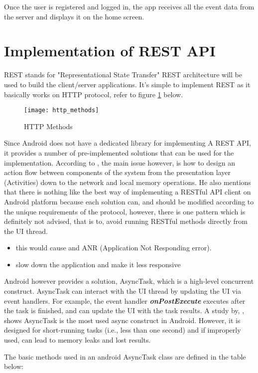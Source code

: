  Once the user is registered and logged in, the app receives all the event data from the server and displays it on the home screen.

\section{Implementation of REST API}
REST stands for "Representational State Transfer" REST architecture will be used to build the client/server applications. It's simple to implement REST as it basically works on HTTP protocol, refer to figure \ref{fig:http_methods} below.
\begin{figure}[h!]
	\centering       
	\texttt{[image: http\_methods]}
	\caption{HTTP Methods}
	\label{fig:http_methods}	
\end{figure} 

Since Android does not have a dedicated library for implementing A REST API, it provides a number of pre-implemented solutions that can be used for the implementation. According to \cite{kwon2016design}, the main issue however, is how to design an action
flow between components of the system from the presentation layer (Activities) down to the network and local memory operations.
He also mentions that there is nothing like the best way of implementing a RESTful API client on Android platform
because each solution can, and should be modified according to the unique requirements
of the protocol, however, there is one pattern which is definitely not advised, that is to, avoid running RESTful methods directly from the UI thread.
\begin{itemize}
	\item this would cause and ANR (Application Not Responding error). 
	\item slow down the application and make it less responsive 
\end{itemize}  

 Android however provides a solution, AsyncTask, which is a high-level concurrent construct. AsyncTask can interact with the UI thread by updating the UI via event handlers. For example, the event handler \textbf{\textit{onPostExecute}} executes after the task is finished, and can update the UI with the task results.
 A study by, \cite{7372076}, shows AsyncTask is the most used async construct in Android. However, it is designed for short-running tasks (i.e., less than one second) and if improperly used, can lead to memory leaks and lost results.
 
 The basic methods used in an android AsyncTask class are defined in the table below:
 
